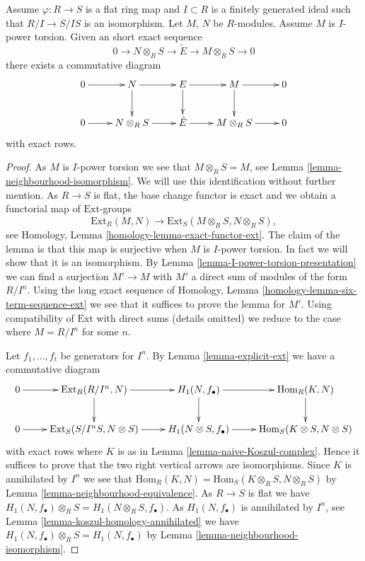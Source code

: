 \begin{lemma}
\label{lemma-neighbourhood-extensions}
Assume $\varphi : R \to S$ is a flat ring map and $I \subset R$ is a
finitely generated ideal such that $R/I \to S/IS$ is an isomorphism.
Let $M$, $N$ be $R$-modules. Assume $M$ is $I$-power torsion.
Given an short exact sequence
$$
0 \to N \otimes_R S \to \tilde E \to M \otimes_R S \to 0
$$
there exists a commutative diagram
$$
\xymatrix{
0 \ar[r] &
N \ar[r] \ar[d] &
E \ar[r] \ar[d] &
M \ar[r] \ar[d] &
0 \\
0 \ar[r] &
N \otimes_R S \ar[r] &
\tilde E \ar[r] &
M \otimes_R S \ar[r] &
0
}
$$
with exact rows.
\end{lemma}

\begin{proof}
As $M$ is $I$-power torsion we see that $M \otimes_R S = M$, see
Lemma \ref{lemma-neighbourhood-isomorphism}.
We will use this identification without further mention.
As $R \to S$ is flat, the base change functor is exact and we
obtain a functorial map of $\text{Ext}$-groups
$$
\text{Ext}_R(M, N)
\longrightarrow
\text{Ext}_S(M \otimes_R S, N \otimes_R S),
$$
see
Homology, Lemma \ref{homology-lemma-exact-functor-ext}.
The claim of the lemma is that this map is surjective when
$M$ is $I$-power torsion. In fact we will show that it is an
isomorphism. By
Lemma \ref{lemma-I-power-torsion-presentation}
we can find a surjection $M' \to M$ with $M'$ a direct sum of
modules of the form $R/I^n$. Using the long exact sequence of
Homology, Lemma \ref{homology-lemma-six-term-sequence-ext}
we see that it suffices to prove the lemma for $M'$.
Using compatibility of $\text{Ext}$ with direct sums (details omitted)
we reduce to the case where $M = R/I^n$ for some $n$.

\medskip\noindent
Let $f_1, \ldots, f_t$ be generators for $I^n$. By
Lemma \ref{lemma-explicit-ext}
we have a commutative diagram
$$
\xymatrix{
0 \ar[r] &
\text{Ext}_R(R/I^n, N) \ar[r] \ar[d] &
H_1(N, f_\bullet) \ar[r] \ar[d] &
\text{Hom}_R(K, N) \ar[d] \\
0 \ar[r] &
\text{Ext}_S(S/I^nS, N \otimes S) \ar[r] &
H_1(N \otimes S, f_\bullet) \ar[r] &
\text{Hom}_S(K \otimes S, N \otimes S)
}
$$
with exact rows where $K$ is as in
Lemma \ref{lemma-naive-Koszul-complex}.
Hence it suffices to prove that the two right vertical arrows are
isomorphisms. Since $K$ is annihilated by $I^n$ we see that
$\text{Hom}_R(K, N) = \text{Hom}_S(K \otimes_R S, N \otimes_R S)$ by
Lemma \ref{lemma-neighbourhood-equivalence}.
As $R \to S$ is flat we have
$H_1(N, f_\bullet) \otimes_R S = H_1(N \otimes_R S, f_\bullet)$.
As $H_1(N, f_\bullet)$ is annihilated by $I^n$, see
Lemma \ref{lemma-koszul-homology-annihilated}
we have $H_1(N, f_\bullet) \otimes_R S = H_1(N, f_\bullet)$ by
Lemma \ref{lemma-neighbourhood-isomorphism}.
\end{proof}

